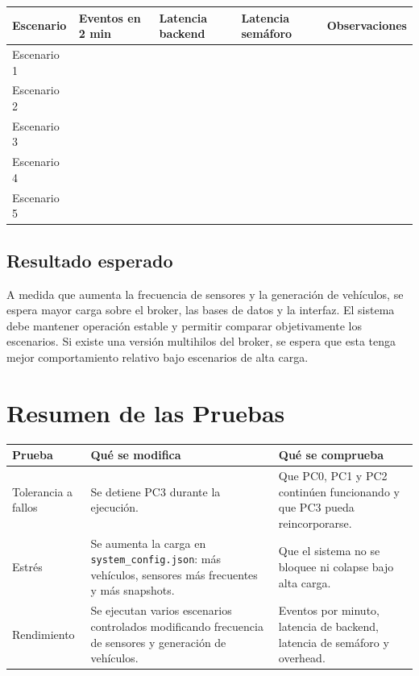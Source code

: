 \documentclass[12pt, a4paper]{article}
\begin{document}
\begin{longtable}{|p{2.5cm}|p{3cm}|p{3cm}|p{3cm}|p{3cm}|}
\hline
\rowcolor{gray!20}
\textbf{Escenario} &
\textbf{Eventos en 2 min} &
\textbf{Latencia backend} &
\textbf{Latencia semáforo} &
\textbf{Observaciones} \\
\hline
Escenario 1 & & & & \\
\hline
Escenario 2 & & & & \\
\hline
Escenario 3 & & & & \\
\hline
Escenario 4 & & & & \\
\hline
Escenario 5 & & & & \\
\hline
\end{longtable}

\subsection{Resultado esperado}

A medida que aumenta la frecuencia de sensores y la generación de vehículos, se espera mayor carga sobre el broker, las bases de datos y la interfaz. El sistema debe mantener operación estable y permitir comparar objetivamente los escenarios. Si existe una versión multihilos del broker, se espera que esta tenga mejor comportamiento relativo bajo escenarios de alta carga.



\section{Resumen de las Pruebas}

\begin{longtable}{|p{3cm}|p{4.5cm}|p{5.5cm}|}
\hline
\rowcolor{gray!20}
\textbf{Prueba} & \textbf{Qué se modifica} & \textbf{Qué se comprueba} \\
\hline
Tolerancia a fallos &
Se detiene PC3 durante la ejecución. &
Que PC0, PC1 y PC2 continúen funcionando y que PC3 pueda reincorporarse. \\
\hline
Estrés &
Se aumenta la carga en \texttt{system\_config.json}: más vehículos, sensores más frecuentes y más snapshots. &
Que el sistema no se bloquee ni colapse bajo alta carga. \\
\hline
Rendimiento &
Se ejecutan varios escenarios controlados modificando frecuencia de sensores y generación de vehículos. &
Eventos por minuto, latencia de backend, latencia de semáforo y overhead. \\
\hline
\end{longtable}
\end{document}
